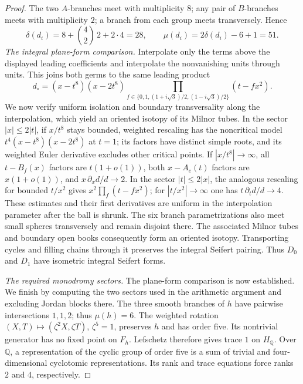 \begin{proof}
The two \(A\)-branches meet with multiplicity \(8\); any pair of
\(B\)-branches meets with multiplicity \(2\); a branch from each group
meets transversely. Hence
\[
 \delta(d_i)=8+\binom42\,2+2\cdot4=28,\qquad
 \mu(d_i)=2\delta(d_i)-6+1=51.
\]
\smallskip
\noindent\emph{The integral plane-form comparison.}
Interpolate only the terms above the displayed leading coefficients
and interpolate the nonvanishing units through units. This joins both
germs to the same leading product
\[
 d_\circ=(x-t^8)(x-2t^8)
       \prod_{f\in\{0,1,(1+i\sqrt3)/2,(1-i\sqrt3)/2\}}(t-fx^2).
\]
We now verify uniform isolation and boundary transversality along the
interpolation, which yield an oriented isotopy of its Milnor tubes.
In the sector \(|x|\le 2|t|\), if \(x/t^8\) stays bounded, weighted
rescaling has the noncritical model
\(t^4(x-t^8)(x-2t^8)\) at \(t=1\); its factors have distinct simple
roots, and its weighted Euler derivative excludes other critical
points. If \(|x/t^8|\to\infty\), all \(t-B_f(x)\) factors are
\(t(1+o(1))\), both \(x-A_e(t)\) factors are \(x(1+o(1))\), and
\(x\,\partial_x d/d\to2\). In the sector \(|t|\le2|x|\), the analogous
rescaling for bounded \(t/x^2\) gives
\(x^2\prod_f(t-fx^2)\); for \(|t/x^2|\to\infty\) one has
\(t\,\partial_t d/d\to4\). These estimates and their first
derivatives are uniform in the interpolation parameter after the
ball is shrunk. The six branch parametrizations also meet small
spheres transversely and remain disjoint there. The associated
Milnor tubes and boundary open books consequently form an oriented
isotopy. Transporting cycles and filling chains through it preserves
the integral Seifert pairing. Thus \(D_0\) and \(D_1\) have isometric
integral Seifert forms.

\smallskip
\noindent\emph{The required monodromy sectors.}
The plane-form comparison is now established. We finish by computing
the two sectors used in the arithmetic argument and excluding Jordan
blocks there. The three smooth branches of \(h\) have pairwise intersections
\(1,1,2\); thus \(\mu(h)=6\). The weighted rotation
\((X,T)\mapsto(\zeta^2X,\zeta T)\), \(\zeta^5=1\), preserves \(h\)
and has order five. Its nontrivial generator has no fixed point on
\(F_h\). Lefschetz therefore gives trace \(1\) on \(H_{\mathbb Q}\). Over
\(\mathbb Q\), a representation of the cyclic group of order five
is a sum of trivial and four-dimensional cyclotomic representations.
Its rank and trace equations force ranks \(2\) and \(4\), respectively.


\end{proof}
